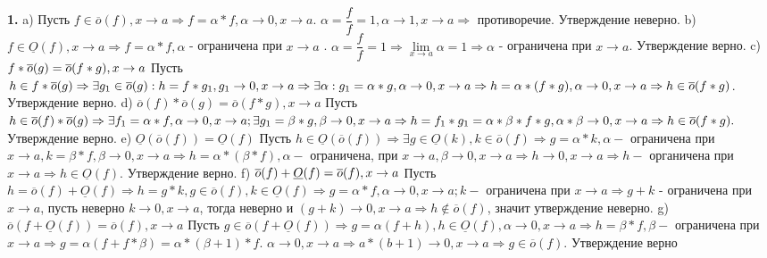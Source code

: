 \documentclass[11pt]{article}
\begin{document}
	\quad \bs
	\textbf{1.} \sspace
	a) Пусть $f \in \overline{o}(f), x \to a \Rightarrow f = \alpha * f, \alpha \to 0, x \to a$. $\alpha = \dfrac{f}{f} = 1, \alpha \to 1, x \to a \Rightarrow $ противоречие. Утверждение неверно. \sspace
	b) $f \in \underline{O}(f), x \to a \Rightarrow f = \alpha * f, \alpha$ - ограничена при $x \to a$ . $\alpha = \dfrac{f}{f} = 1 \Rightarrow \lim\limits_{x \to a} \alpha = 1 \Rightarrow \alpha$ - ограничена при $x \to a$. Утверждение верно.  \sspace
	c) $f * \overline{o}(g) = \overline{o}(f * g), x \to a \\\\$
	Пусть $h \in f * \overline{o}(g) \Rightarrow \exists g_1 \in \overline{o}(g): h = f * g_1, g_1 \to 0, x \to a \Rightarrow \exists \alpha: g_1 = \alpha * g, \alpha \to 0, x \to a \Rightarrow \\\\ 
	h = \alpha * (f * g), \alpha \to 0, x \to a \Rightarrow h \in \overline{o}(f * g)$. Утверждение верно.  \sspace
	d) $\overline{o}(f) * \overline{o}(g) = \overline{o}(f * g), x \to a$ \sspace
	Пусть $h \in \overline{o}(f) * \overline{o}(g) \Rightarrow \exists f_1 = \alpha * f, \alpha \to 0, x \to a; \exists g_1 = \beta * g, \beta \to 0, x \to a \Rightarrow \\\\
	h = f_1 * g_1 = \alpha * \beta * f * g, \alpha * \beta \to 0, x \to a \Rightarrow h \in  \overline{o}(f * g). $ Утверждение верно. \sspace
	e) $\underline{O}(\overline{o}(f)) = \underline{O}(f)$ \sspace
	Пусть $h \in \underline{O}(\overline{o}(f)) \Rightarrow \exists g \in \underline{O}(k), k \in \overline{o}(f) \Rightarrow g = \alpha * k, \alpha -$ ограничена при $x \to a, k = \beta * f, \beta \to 0, x \to a \Rightarrow h = \alpha * (\beta * f), \alpha - $ ограничена, при $x \to a, \beta \to 0, x \to a \Rightarrow h \to 0, x \to a \Rightarrow h - $ органичена при $x \to a \Rightarrow h \in \underline{O}(f)$. Утверждение верно. \sspace
	f) $\overline{o}(f) + \underline{O}(f) = \overline{o}(f), x \to a \\\\$
	Пусть $h = \overline{o}(f) + \underline{O}(f) \Rightarrow h = g * k, g \in \overline{o}(f), k \in \underline{O}(f) \Rightarrow g = \alpha * f, \alpha \to 0, x \to a; k -$ ограничена при $x \to a \Rightarrow g  + k$ - ограничена при $x \to a$, пусть неверно $k \to 0, x \to a$, тогда неверно и $(g + k) \to 0, x \to a \Rightarrow h \not \in \overline{o}(f)$, значит утверждение неверно. \sspace
	g) $\overline{o}(f + \underline{O}(f)) = \overline{o}(f), x \to a$ \sspace
	Пусть $g \in \overline{o}(f + \underline{O}(f)) \Rightarrow g = \alpha (f + h), h \in \underline{O}(f), \alpha \to 0, x \to a \Rightarrow h = \beta * f, \beta -$ ограничена при $x \to a \Rightarrow g = \alpha (f + f * \beta) = \alpha * (\beta + 1) * f$. $\alpha \to 0, x \to a \Rightarrow a * (b + 1) \to 0, x \to a \Rightarrow g \in \overline{o}(f)$. Утверждение верно \sspace
\end{document}
